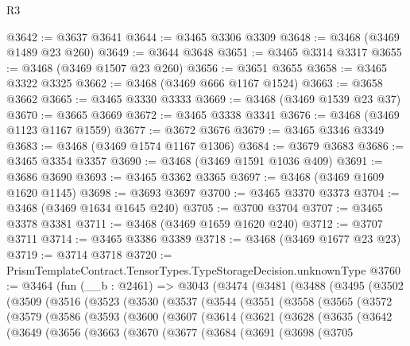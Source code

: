 \begin{lexlean}{R3}
\begin{coremodule}
@3642 := @3637 @3641
@3644 := @3465 @3306 @3309
@3648 := @3468 (@3469 @1489 @23 @260)
@3649 := @3644 @3648
@3651 := @3465 @3314 @3317
@3655 := @3468 (@3469 @1507 @23 @260)
@3656 := @3651 @3655
@3658 := @3465 @3322 @3325
@3662 := @3468 (@3469 @666 @1167 @1524)
@3663 := @3658 @3662
@3665 := @3465 @3330 @3333
@3669 := @3468 (@3469 @1539 @23 @37)
@3670 := @3665 @3669
@3672 := @3465 @3338 @3341
@3676 := @3468 (@3469 @1123 @1167 @1559)
@3677 := @3672 @3676
@3679 := @3465 @3346 @3349
@3683 := @3468 (@3469 @1574 @1167 @1306)
@3684 := @3679 @3683
@3686 := @3465 @3354 @3357
@3690 := @3468 (@3469 @1591 @1036 @409)
@3691 := @3686 @3690
@3693 := @3465 @3362 @3365
@3697 := @3468 (@3469 @1609 @1620 @1145)
@3698 := @3693 @3697
@3700 := @3465 @3370 @3373
@3704 := @3468 (@3469 @1634 @1645 @240)
@3705 := @3700 @3704
@3707 := @3465 @3378 @3381
@3711 := @3468 (@3469 @1659 @1620 @240)
@3712 := @3707 @3711
@3714 := @3465 @3386 @3389
@3718 := @3468 (@3469 @1677 @23 @23)
@3719 := @3714 @3718
@3720 := PrismTemplateContract.TensorTypes.TypeStorageDecision.unknownType
@3760 := @3464
    (fun (__b : @2461) =>
    @3043
      (@3474
        (@3481
          (@3488
            (@3495
              (@3502
                (@3509
                  (@3516
                    (@3523
                      (@3530
                        (@3537
                          (@3544
                            (@3551
                              (@3558
                                (@3565
                                  (@3572
                                    (@3579
                                      (@3586
                                        (@3593
                                          (@3600
                                            (@3607
                                              (@3614
                                                (@3621
                                                  (@3628
                                                    (@3635
                                                      (@3642
                                                        (@3649
                                                          (@3656
                                                            (@3663
                                                              (@3670
                                                                (@3677
                                                                  (@3684
                                                                    (@3691
                                                                      (@3698
                                                                        (@3705

\end{coremodule}
\end{lexlean}
